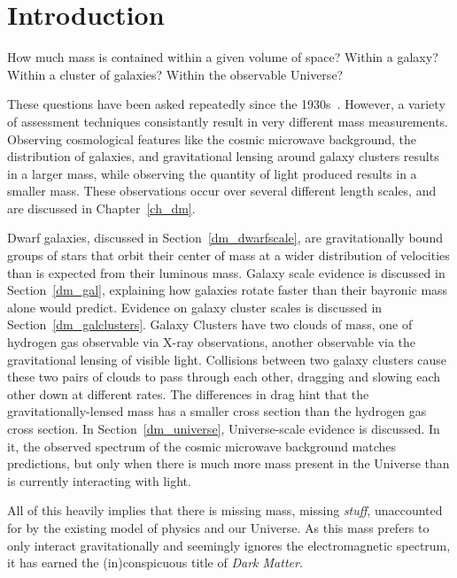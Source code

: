 \cleartooddpage[\thispagestyle{empty}]
\chapter{Introduction}

  How much mass is contained within a given volume of space?
  Within a galaxy?
  Within a cluster of galaxies?
  Within the observable Universe?

  These questions have been asked repeatedly since the 1930s~\cite{zwicky1937}.
  However, a variety of assessment techniques consistantly result in very different mass measurements.
  Observing cosmological features like the cosmic microwave background, the distribution of galaxies, and gravitational lensing around galaxy clusters results in a larger mass, while observing the quantity of light produced results in a smaller mass.
  These observations occur over several different length scales, and are discussed in Chapter~\ref{ch_dm}.

  Dwarf galaxies, discussed in Section~\ref{dm_dwarfscale}, are gravitationally bound groups of stars that orbit their center of mass at a wider distribution of velocities than is expected from their luminous mass.
  Galaxy scale evidence is discussed in Section~\ref{dm_gal}, explaining how galaxies rotate faster than their bayronic mass alone would predict.
  Evidence on galaxy cluster scales is discussed in Section~\ref{dm_galclusters}.
  Galaxy Clusters have two clouds of mass, one of hydrogen gas observable via X-ray observations, another observable via the gravitational lensing of visible light.
  Collisions between two galaxy clusters cause these two pairs of clouds to pass through each other, dragging and slowing each other down at different rates.
  The differences in drag hint that the gravitationally-lensed mass has a smaller cross section than the hydrogen gas cross section.
  In Section~\ref{dm_universe}, Universe-scale evidence is discussed.
  In it, the observed spectrum of the cosmic microwave background matches predictions, but only when there is much more mass present in the Universe than is currently interacting with light.

  All of this heavily implies that there is missing mass, missing \textit{stuff}, unaccounted for by the existing model of physics and our Universe.
  As this mass prefers to only interact gravitationally and seemingly ignores the electromagnetic spectrum, it has earned the (in)conspicuous title of \textit{Dark Matter}.

